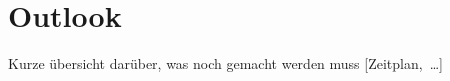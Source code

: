 
\section{Outlook}
\begin{frame}{Kurze übersicht darüber, was noch gemacht werden muss}
   [Zeitplan,~\ldots]
\end{frame}